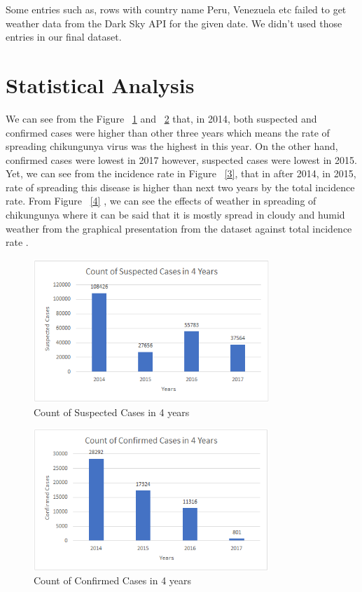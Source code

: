 \documentclass[conference]{IEEEtran}
\begin{document}
Some entries such as, rows with country name Peru, Venezuela etc failed to get weather data from the Dark Sky API for the given date. We didn’t used those entries in our final dataset. 


\section{Statistical Analysis}
We can see from the Figure  ~\ref{1} and ~\ref{2} that, in 2014, both suspected and confirmed cases were higher than other three years which means the rate of spreading chikungunya virus was the highest in this year. On the other hand, confirmed cases were lowest in 2017 however, suspected cases were lowest in 2015. Yet, we can see from the incidence rate in Figure ~\ref{3}, that in after 2014, in 2015, rate of spreading this disease is higher than next two years by the total incidence rate.
From Figure  ~\ref{4} , we can see the effects of weather in spreading of chikungunya where it can be said that it is mostly spread in cloudy and humid weather from the graphical presentation from the dataset against total incidence rate .

\begin{figure}[ht!] %
 \centering
 \includegraphics[width=3.5in]{1.png}
 \caption{Count of Suspected Cases in 4 years}
 \label{1}
 \end{figure}


\begin{figure}[ht!] %
 \centering
 \includegraphics[width=3.5in]{2.png}
 \caption{Count of Confirmed Cases in 4 years}
 \label{2}
 \end{figure}
\end{document}

